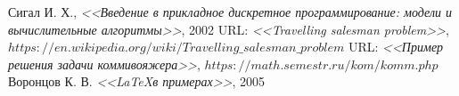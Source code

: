 \documentclass[a4paper, 12pt] {article}
\begin{document}
\begin{thebibliography}{9}
 Сигал И. Х., \emph{<<Введение в прикладное дискретное 
программирование: модели и вычислительные алгоритмы>>}, 2002
 URL: \emph{<<Travelling salesman problem>>}, $https://en.wikipedia.org/wiki/Travelling\_salesman\_problem$
 URL: \emph{<<Пример решения задачи коммивояжера>>}, $https://math.semestr.ru/kom/komm.php$
 Воронцов К. В. \emph{<<\LaTeX в примерах>>}, 2005
\end{thebibliography}
\end{document}
